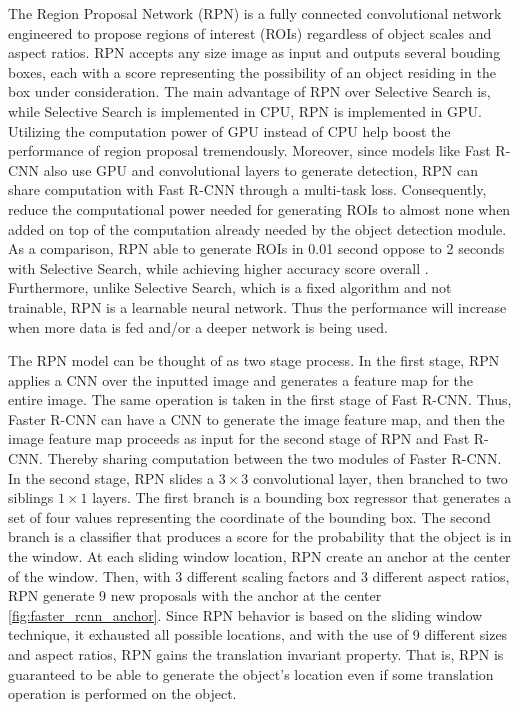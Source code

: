 The Region Proposal Network (RPN) is a fully connected convolutional network engineered to propose regions of interest (ROIs) regardless of object scales and aspect ratios. RPN accepts any size image as input and outputs several bouding boxes, each with a score representing the possibility of an object residing in the box under consideration. The main advantage of RPN over Selective Search is, while Selective Search is implemented in CPU, RPN is implemented in GPU. Utilizing the computation power of GPU instead of CPU help boost the performance of region proposal tremendously. Moreover, since models like Fast R-CNN also use GPU and convolutional layers to generate detection, RPN can share computation with Fast R-CNN through a multi-task loss. Consequently, reduce the computational power needed for generating ROIs to almost none when added on top of the computation already needed by the object detection module. As a comparison, RPN able to generate ROIs in 0.01 second oppose to 2 seconds with Selective Search, while achieving higher accuracy score overall \cite{faster_rcnn_2015}. Furthermore, unlike Selective Search, which is a fixed algorithm and not trainable, RPN is a learnable neural network. Thus the performance will increase when more data is fed and/or a deeper network is being used. 

The RPN model can be thought of as two stage process. In the first stage, RPN applies a CNN over the inputted image and generates a feature map for the entire image. The same operation is taken in the first stage of Fast R-CNN. Thus, Faster R-CNN can have a CNN to generate the image feature map, and then the image feature map proceeds as input for the second stage of RPN and Fast R-CNN. Thereby sharing computation between the two modules of Faster R-CNN. In the second stage, RPN slides a $3 \times 3$ convolutional layer, then branched to two siblings $1 \times 1$ layers. The first branch is a bounding box regressor that generates a set of four values representing the coordinate of the bounding box. The second branch is a classifier that produces a score for the probability that the object is in the window. At each sliding window location, RPN create an anchor at the center of the window. Then, with 3 different scaling factors and 3 different aspect ratios, RPN generate 9 new proposals with the anchor at the center \ref{fig:faster_rcnn_anchor}. Since RPN behavior is based on the sliding window technique, it exhausted all possible locations, and with the use of 9 different sizes and aspect ratios, RPN gains the translation invariant property. That is, RPN is guaranteed to be able to generate the object's location even if some translation operation is performed on the object.

